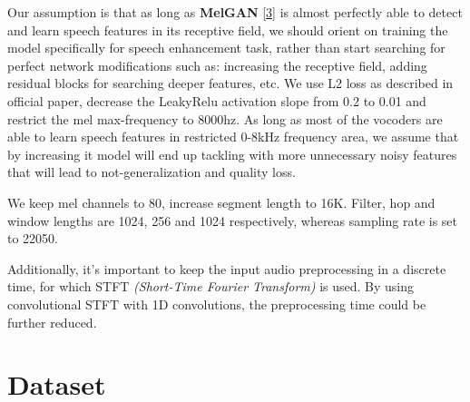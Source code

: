 \documentclass{article}
\begin{document}
\begin{flushleft}

Our assumption is that as long as \textbf{MelGAN} \hyperlink{refer}{[3]} is almost perfectly able to detect and learn speech features in its receptive field, we should orient on training the model specifically for speech enhancement task, rather than start searching for perfect network modifications such as: increasing the receptive field, adding residual blocks for searching deeper features, etc. 
We use L2 loss as described in official paper, decrease the LeakyRelu activation slope from 0.2 to 0.01 and restrict the mel max-frequency to 8000hz. As long as most of the vocoders are able to learn speech features in restricted 0-8kHz frequency area, we assume that by increasing it model will end up tackling with more unnecessary noisy features that will lead to not-generalization and quality loss.
\end{flushleft}
\begin{flushleft}

We keep mel channels to 80, increase segment length to 16K. Filter, hop and window lengths are 1024, 256 and 1024 respectively, whereas sampling rate is set to 22050.

\end{flushleft}
\begin{flushleft}

Additionally, it's important to keep the input audio preprocessing in a discrete time, for which STFT \textit{(Short-Time Fourier Transform)} is used. By using convolutional STFT with 1D convolutions, the preprocessing time could be further reduced. 

\end{flushleft}


\section{Dataset}
\end{document}
